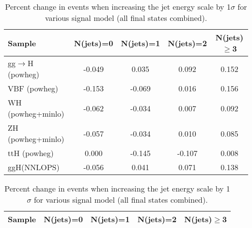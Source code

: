 \begin{table}[!h!tb]
\begin{center}
\small
\caption{
Percent change in events when increasing the jet energy scale by 1$\sigma$ for various signal model (all final states combined).
\label{tab:jesSM}
}
\begin{tabular}{|l|c|c|c|c|} \hline 
Sample & N(jets)=0 & N(jets)=1 & N(jets)=2 & N(jets)$\geq$3 \\ \hline 
gg$\rightarrow$H ({\sc powheg})  & -0.049 & 0.035 & 0.092 & 0.152 \\ 
VBF ({\sc powheg})  & -0.153 & -0.069 & 0.016 & 0.156 \\ 
WH ({\sc powheg+minlo}) & -0.062 & -0.034 & 0.007 & 0.092 \\ 
ZH ({\sc powheg+minlo})  & -0.057 & -0.034 & 0.010 & 0.085 \\ 
ttH ({\sc powheg}) & 0.000 & -0.145 & -0.107 & 0.008 \\ 
ggH(NNLOPS) & -0.056 & 0.041 & 0.071 & 0.138 \\ 

\hline
\end{tabular}
\normalsize
\end{center}
\end{table}
 
 
 
\begin{table}[!h!tb]
\begin{center}
\small
\caption{
Percent change in events when increasing the jet energy scale by 1$\sigma$ for various signal model (all final states combined).
\label{tab:jesExo}
}
\begin{tabular}{|l|c|c|c|c|} \hline 
Sample & N(jets)=0 & N(jets)=1 & N(jets)=2 & N(jets)$\geq$3 \\ \hline 

\hline
\end{tabular}
\normalsize
\end{center}
\end{table}
 
 
 
